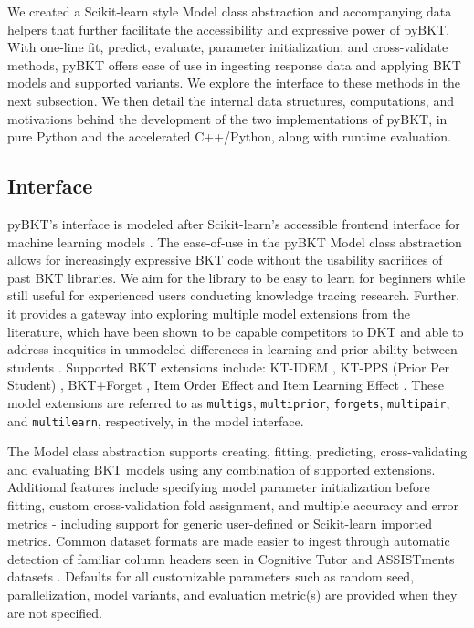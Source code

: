 \documentclass{edm_article}
\begin{document}
We created a Scikit-learn style \cite{pedregosa2011scikit} Model class abstraction and accompanying data helpers that further facilitate the accessibility and expressive power of pyBKT. With one-line fit, predict, evaluate, parameter initialization, and cross-validate methods, pyBKT offers ease of use in ingesting response data and applying BKT models and supported variants. We explore the interface to these methods in the next subsection. We then detail the internal data structures, computations, and motivations behind the development of the two implementations of pyBKT, in pure Python and the accelerated C++/Python, along with runtime evaluation. %

\subsection{Interface}

pyBKT's interface is modeled after Scikit-learn's accessible frontend interface for machine learning models \cite{pedregosa2011scikit}. The ease-of-use in the pyBKT Model class abstraction allows for increasingly expressive BKT code without the usability sacrifices of past BKT libraries. We aim for the library to be easy to learn for beginners while still useful for experienced users conducting knowledge tracing research. Further, it provides a gateway into exploring multiple model extensions from the literature, which have been shown to be capable competitors to DKT \cite{khajah2016deep} and able to address inequities in unmodeled differences in learning and prior ability between students \cite{doroudi2019fairer}. Supported BKT extensions include: KT-IDEM \cite{pardos2011kt}, KT-PPS (Prior Per Student) \cite{pardos2010modeling}, BKT+Forget \cite{khajah2016deep}, Item Order Effect \cite{pardos2009determining} and Item Learning Effect \cite{pardos2009detecting,pardos2013adapting}. These model extensions are referred to as \verb+multigs+, \verb+multiprior+, \verb+forgets+, \verb+multipair+, and \verb+multilearn+, respectively, in the model interface.

The Model class abstraction supports creating, fitting, predicting, cross-validating and evaluating BKT models using any combination of supported extensions. Additional features include specifying model parameter initialization before fitting, custom cross-validation fold assignment, and multiple accuracy and error metrics - including support for generic user-defined or Scikit-learn imported metrics. Common dataset formats are made easier to ingest through automatic detection of familiar column headers seen in Cognitive Tutor \cite{koedinger1997intelligent} and ASSISTments datasets \cite{heffernan2014assistments}. Defaults for all customizable parameters such as random seed, parallelization, model variants, and evaluation metric(s) are provided when they are not specified.
\end{document}
